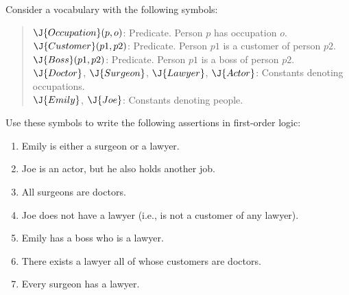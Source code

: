 \begin{exercise}%
Consider a vocabulary with the following symbols:
\begin{quote}
\(\J{Occupation}(p,o)\): Predicate. Person \(p\) has occupation \(o\). \\
\(\J{Customer}(p1,p2)\): Predicate. Person \(p1\) is a customer of person \(p2\). \\
\(\J{Boss}(p1,p2)\): Predicate. Person \(p1\) is a boss of person \(p2\). \\
\(\J{Doctor}\), \( \J{Surgeon}\), \( \J{Lawyer}\), \( \J{Actor}\): Constants denoting occupations. \\
\(\J{Emily}\), \( \J{Joe}\): Constants denoting people.
\end{quote}
Use these symbols to write the following assertions in first-order logic:
\begin{enumerate}
\item Emily is either a surgeon or a lawyer.
\item Joe is an actor, but he also holds another job.
\item All surgeons are doctors.
\item Joe does not have a lawyer (i.e., is not a customer of any lawyer).
\item Emily has a boss who is a lawyer.
\item There exists a lawyer all of whose customers are doctors.
\item Every surgeon has a lawyer.
\end{enumerate}
\end{exercise} 

